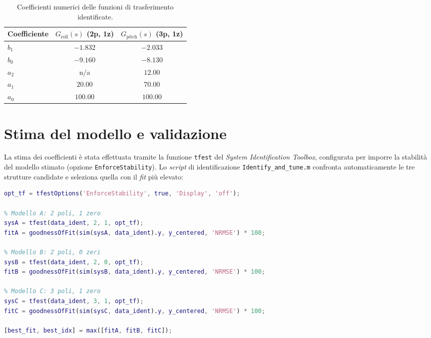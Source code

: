 \documentclass[11pt]{report}
\begin{document}
\begin{table}[H]
	\centering
	\begin{tabular}{l c c}
		\toprule
		\textbf{Coefficiente} & \textbf{$G_\text{roll}(s)$ (2p, 1z)} & \textbf{$G_\text{pitch}(s)$ (3p, 1z)} \\
		\midrule
		$b_1$ & $-1.832$ & $-2.033$ \\
		$b_0$ & $-9.160$ & $-8.130$ \\
		$a_2$ & n/a & $12.00$ \\
		$a_1$ & $20.00$ & $70.00$ \\
		$a_0$ & $100.00$ & $100.00$ \\
		\bottomrule
	\end{tabular}
	\caption{Coefficienti numerici delle funzioni di trasferimento identificate.}
	\label{tab:coefficienti_tf}
\end{table}

\section{Stima del modello e validazione}
\label{sec:stima_validazione}

La stima dei coefficienti è stata effettuata tramite la funzione \texttt{tfest} del \textit{System Identification Toolbox}, configurata per imporre la stabilità del modello stimato (opzione \texttt{EnforceStability}). Lo \textit{script} di identificazione \texttt{Identify\_and\_tune.m} confronta automaticamente le tre strutture candidate e seleziona quella con il \textit{fit} più elevato:

\begin{lstlisting}[language=Matlab, caption={Confronto automatico delle tre strutture candidate (estratto da \texttt{Identify\_and\_tune.m})}]
opt_tf = tfestOptions('EnforceStability', true, 'Display', 'off');

% Modello A: 2 poli, 1 zero
sysA = tfest(data_ident, 2, 1, opt_tf);
fitA = goodnessOfFit(sim(sysA, data_ident).y, y_centered, 'NRMSE') * 100;

% Modello B: 2 poli, 0 zeri
sysB = tfest(data_ident, 2, 0, opt_tf);
fitB = goodnessOfFit(sim(sysB, data_ident).y, y_centered, 'NRMSE') * 100;

% Modello C: 3 poli, 1 zero
sysC = tfest(data_ident, 3, 1, opt_tf);
fitC = goodnessOfFit(sim(sysC, data_ident).y, y_centered, 'NRMSE') * 100;

[best_fit, best_idx] = max([fitA, fitB, fitC]);
\end{lstlisting}
\end{document}
